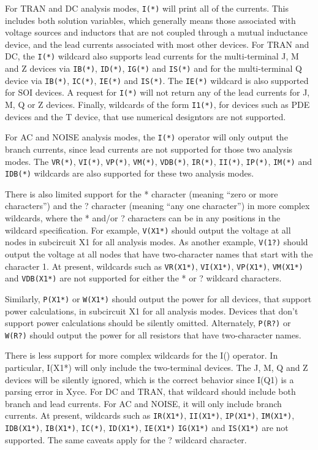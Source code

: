 For TRAN and DC analysis modes, \texttt{I(*)} will print all of the
currents.  This includes both solution variables, which generally means those
associated  with voltage sources and inductors that are not coupled through
a mutual inductance device, and the lead currents associated with most
other devices.  For TRAN and DC, the \texttt{I(*)} wildcard also supports
lead currents for the multi-terminal J, M and Z devices via
\texttt{IB(*)}, \texttt{ID(*)}, \texttt{IG(*)} and \texttt{IS(*)} and 
for the multi-terminal Q device via \texttt{IB(*)}, \texttt{IC(*)}, \texttt{IE(*)}
and \texttt{IS(*)}.  The \texttt{IE(*)} wildcard is also supported for SOI
devices.  A  request for \texttt{I(*)} will not return any of the lead currents
for  J, M, Q or Z devices.  Finally, wildcards of the form \texttt{I1(*)},
for devices such as PDE devices and the T device, that use numerical designtors
are not supported.

For AC and NOISE analysis modes, the \texttt{I(*)} operator will only output
the branch currents, since lead currents are not supported for those two
analysis modes.  The \texttt{VR(*)}, \texttt{VI(*)}, \texttt{VP(*)},
\texttt{VM(*)}, \texttt{VDB(*)}, \texttt{IR(*)}, \texttt{II(*)},
\texttt{IP(*)}, \texttt{IM(*)} and \texttt{IDB(*)} wildcards are also
supported for these two analysis modes.

There is also limited support for the * character (meaning ``zero or more
characters'') and the ? character (meaning ``any one character'') in more
complex wildcards, where the * and/or ? characters can be in
any positions in the wildcard specification.  For example, \texttt{V(X1*)}
should output the voltage at all nodes in subcircuit X1 for all analysis
modes.  As another example, \texttt{V(1?)} should output the voltage at all
nodes that have two-character names that start with the character 1.  At present,
wildcards such as \texttt{VR(X1*)}, \texttt{VI(X1*)}, \texttt{VP(X1*)},
\texttt{VM(X1*)} and \texttt{VDB(X1*)} are not supported for either the *
or ? wildcard characters.

Similarly, \texttt{P(X1*)} or \texttt{W(X1*)} should output the
power for all devices, that support power calculations, in subcircuit X1
for all analysis modes.  Devices that don't support power calculations
should be silently omitted.  Alternately, \texttt{P(R?)} or \texttt{W(R?)}
should output the power for all resistors that have two-character names.

There is less support for more complex wildcards for the I()
operator.  In particular, I(X1*) will only include the two-terminal
devices.  The J, M, Q and Z devices will be silently ignored,
which is the correct behavior since I(Q1) is a parsing error in Xyce.
For DC and TRAN, that wildcard should include both branch and lead
currents.  For AC and NOISE, it will only include branch currents. At
present, wildcards such as \texttt{IR(X1*)}, \texttt{II(X1*)},
\texttt{IP(X1*)}, \texttt{IM(X1*)}, \texttt{IDB(X1*)}, \texttt{IB(X1*)},
\texttt{IC(*)}, \texttt{ID(X1*)}, \texttt{IE(X1*)} \texttt{IG(X1*)} and
\texttt{IS(X1*)} are not supported.  The same caveats apply for the ?
wildcard character.

